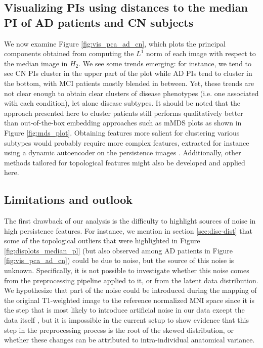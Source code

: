 \documentclass{article}
\begin{document}
\subsection{Visualizing PIs using distances to the median PI of AD patients and CN subjects}

We now examine Figure \ref{fig:vis_pca_ad_cn}, which plots the principal components obtained from
computing the $L^1$ norm of each image with respect to the median image in $H_2$. We see some trends
emerging: for instance, we tend to see CN PIs cluster in the upper part of the plot while AD PIs
tend to cluster in the bottom, with MCI patients mostly blended in between. Yet, these trends are
not clear enough to obtain clear clusters of disease phenotypes (i.e. one associated with each
condition), let alone disease subtypes. It should be noted that the approach presented here to
cluster patients still performs qualitatively better than out-of-the-box embedding approaches such
as mMDS plots as shown in Figure \ref{fig:mds_plot}. Obtaining features more salient for clustering
various subtypes would probably require more complex features, extracted for instance using a
dynamic autoencoder on the persistence images \citep{mrabah2019deep}. Additionally, other methods
tailored for topological features might also be developed and applied here.

\subsection{Limitations and outlook}

The first drawback of our analysis is the difficulty to highlight sources of noise in high
persistence features. For instance, we mention in section \ref{sec:disc-dist} that some of the
topological outliers that were highlighted in Figure \ref{fig:displots_median_pl} (but also observed
among AD patients in Figure \ref{fig:vis_pca_ad_cn}) could be due to noise, but the source of this
noise is unknown. Specifically, it is not possible to investigate whether this noise comes from the
preprocessing pipeline applied to it, or from the latent data distribution. We hypothesize that part
of the noise could be introduced during the mapping of the original T1-weighted image to the
reference normalized MNI space since it is the step that is most likely to introduce artificial
noise in our data except the data itself \citep{collins19943d}, but it is impossible in the
current setup to show evidence that this step in the preprocessing process is the root of the skewed
distribution, or whether these changes can be attributed to intra-individual anatomical variance.
\end{document}
